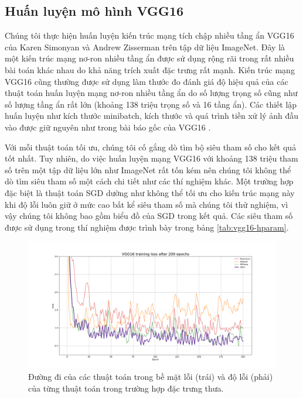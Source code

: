 \subsection{Huấn luyện mô hình VGG16}
\label{exp:vgg16}

Chúng tôi thực hiện huấn luyện kiến trúc mạng tích chập nhiều tầng ẩn VGG16 của Karen Simonyan và Andrew Zisserman \cite{simonyan2014verydeep} trên tập dữ liệu ImageNet. Đây là một kiến trúc mạng nơ-ron nhiều tầng ẩn được sử dụng rộng rãi trong rất nhiều bài toán khác nhau do khả năng trích xuất đặc trưng rất mạnh. Kiến trúc mạng VGG16 cũng thường được sử dụng làm thước đo đánh giá độ hiệu quả của các thuật toán huấn luyện mạng nơ-ron nhiều tầng ẩn \cite{zhuan2020adabelief}\cite{schneider2018deepobs} do số lượng trọng số cũng như số lượng tầng ẩn rất lớn (khoảng 138 triệu trọng số và 16 tầng ẩn). Các thiết lập huấn luyện như kích thước minibatch, kích thước và quá trình tiền xử lý ảnh đầu vào được giữ nguyên như trong bài báo gốc của VGG16 \cite{simonyan2014verydeep}.

Với mỗi thuật toán tối ưu, chúng tôi cố gắng dò tìm bộ siêu tham số cho kết quả tốt nhất. Tuy nhiên, do việc huấn luyện mạng VGG16 với khoảng 138 triệu tham số trên một tập dữ liệu lớn như ImageNet rất tốn kém nên chúng tôi không thể dò tìm siêu tham số một cách chi tiết như các thí nghiệm khác. Một trường hợp đặc biệt là thuật toán SGD dường như không thể tối ưu cho kiến trúc mạng này khi độ lỗi luôn giữ ở mức cao bất kể siêu tham số mà chúng tôi thử nghiệm, vì vậy chúng tôi không bao gồm biểu đồ của SGD trong kết quả. Các siêu tham số được sử dụng trong thí nghiệm được trình bày trong bảng \ref{tab:vgg16-hparam}.

\begin{figure}[htp]
	\centering
	\includegraphics[width=140 mm]{images/vgg16.png}
	\caption{Đường đi của các thuật toán trong bề mặt lỗi (trái) và độ lỗi (phải) của từng thuật toán trong trường hợp đặc trưng thưa.}
	\label{fig:vgg16-loss}
\end{figure}

